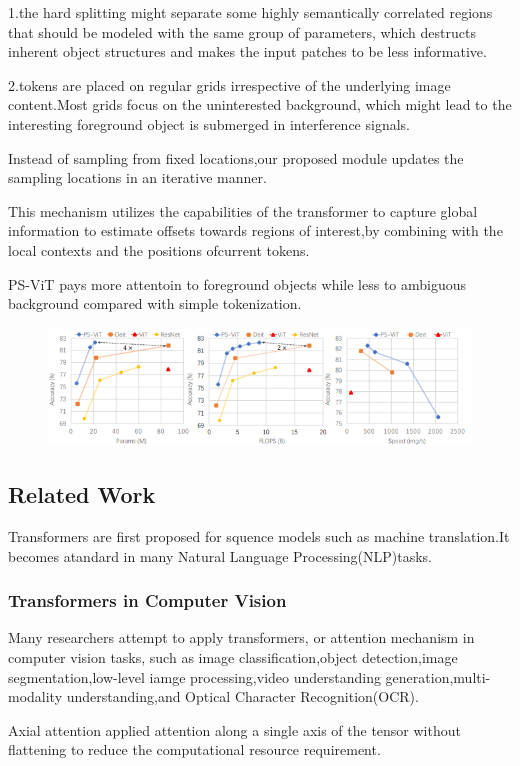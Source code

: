 \documentclass[11pt]{article}
\begin{document}
1.the hard splitting might separate some highly semantically correlated regions that should be modeled with the same group of parameters, which destructs inherent object structures and makes the input patches to be less informative.

2.tokens are placed on regular grids irrespective of the underlying image content.Most grids focus on the uninterested background, which might lead to the interesting foreground object is submerged in interference signals.

Instead of sampling from fixed locations,our proposed module updates the sampling locations in an iterative manner.

This mechanism utilizes the capabilities of the transformer to capture global information to estimate offsets towards regions of interest,by combining with the local contexts and the positions ofcurrent tokens.

PS-ViT pays more attentoin to foreground objects while less to ambiguous background compared with simple tokenization.
\begin{figure}[H]
	\centering
	\includegraphics[scale = 0.6]{39}
\end{figure}
\subsection{Related Work}
Transformers are first proposed for squence models such as machine translation.It becomes atandard in many Natural Language Processing(NLP)tasks.

\subsubsection{Transformers in Computer Vision}
Many researchers attempt to apply transformers, or attention mechanism in computer vision tasks, such as image classification,object detection,image segmentation,low-level iamge processing,video understanding generation,multi-modality understanding,and Optical Character Recognition(OCR).

Axial attention applied attention along a single axis of the tensor without flattening to reduce the computational resource requirement.
\end{document}
